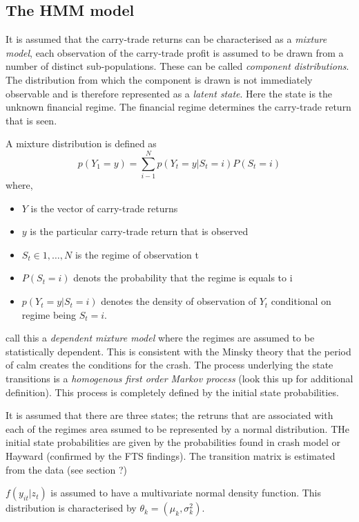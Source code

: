 \documentclass[12pt, a4paper, oneside]{article} %
\begin{document}
\subsection{The HMM model}
It is assumed that the carry-trade returns can be characterised as a \emph{mixture model}, each observation of the carry-trade profit is assumed to be drawn from a number of distinct sub-populations.  These can be called \emph{component distributions}.  The distribution from which the component is drawn is not immediately observable and is therefore represented as a \emph{latent state}.  Here the state is the unknown financial regime.  The financial regime determines the carry-trade return that is seen. 

A mixture distribution is defined as 
\begin{equation}
p(Y_1 = y) = \sum_{i - 1}^N p(Y_t = y|S_t = i)P(S_t = i)
\end{equation}
where,
\begin{itemize}
\item $Y$ is the vector of carry-trade returns
\item $y$ is the particular carry-trade return that is observed
\item $S_t \in {1, \dots, N}$ is the regime of observation t
\item $P(S_t = i)$ denots the probability that the regime is equals to i 
\item $p(Y_t = y|S_t = i)$ denotes the density of observation of $Y_t$ conditional on regime being $S_t = i$.
\end{itemize}

\citet{depmixS4} call this a \emph{dependent mixture model} where the regimes are assumed to be statistically dependent.  This is consistent with the Minsky theory that the period of calm creates the conditions for the crash. The process underlying the state transitions is a \emph{homogenous first order Markov process}  (look this up for additional definition).  This process is completely defined by the initial state probabilities.  

It is assumed that there are three states; the retruns that are associated with each of the regimes area ssumed to be represented by a normal distribution. THe initial state probabilities are given by the probabilities found in crash model or Hayward (confirmed by the FTS findings).  The transition matrix is estimated from the data (see section ?)

$f(y_{it}|z_t)$ is assumed to have a multivariate normal density function. This distribution is characterised by $\theta_k = (\mu_k, \sigma_k^2)$.
\end{document}
